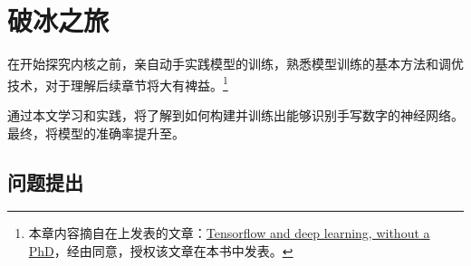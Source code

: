 \begin{savequote}[45mm]
\end{savequote}

\chapter{破冰之旅} 
\label{ch:ice-breaker}

\begin{content}

在开始探究\tf{}内核之前，亲自动手实践模型的训练，熟悉模型训练的基本方法和调优技术，对于理解后续章节将大有裨益。\footnote{ 本章内容摘自在上发表的文章：\href{https://codelabs.developers.google.com/codelabs/cloud-tensorflow-mnist}{Tensorflow and deep learning, without a PhD}，经由同意，授权该文章在本书中发表。}

通过本文学习和实践，将了解到如何构建并训练出能够识别手写数字的神经网络。最终，将模型的准确率提升至。

\end{content}

\section{问题提出}

